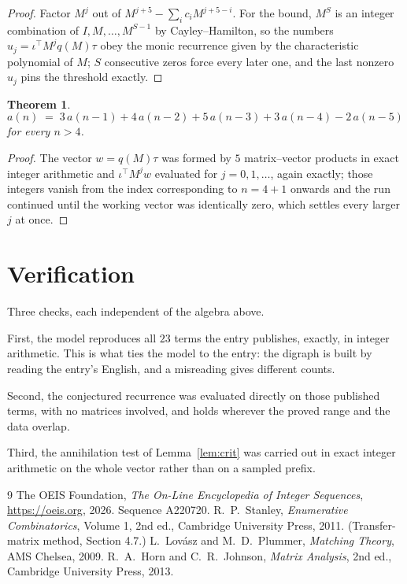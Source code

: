 \documentclass[11pt,a4paper]{article}
\theoremstyle{plain}
\newtheorem{theorem}{Theorem}
\theoremstyle{definition}
\begin{document}
\begin{proof}
Factor $M^{j}$ out of $M^{j+5}-\sum_ic_iM^{j+5-i}$. For the bound, $M^{S}$
is an integer combination of $I,M,\dots,M^{S-1}$ by Cayley--Hamilton, so the numbers
$u_j=\iota^{\!\top}M^{j}q(M)\tau$ obey the monic recurrence given by the characteristic
polynomial of $M$; $S$ consecutive zeros force every later one, and the last nonzero $u_j$
pins the threshold exactly.
\end{proof}

\begin{theorem}
\[
a(n)\;=\;3\,a(n-1) + 4\,a(n-2) + 5\,a(n-3) + 3\,a(n-4) - 2\,a(n-5)
\]
for every $n>4$.
\end{theorem}

\begin{proof}
The vector $w=q(M)\tau$ was formed by $5$ matrix--vector products in exact integer
arithmetic and $\iota^{\!\top}M^{j}w$ evaluated for $j=0,1,\dots$, again exactly; those
integers vanish from the index corresponding to $n=4+1$ onwards and the run continued
until the working vector was identically zero, which settles every larger $j$ at once.
\end{proof}

\section{Verification}

Three checks, each independent of the algebra above.

First, the model reproduces all $23$ terms the entry publishes, exactly, in integer
arithmetic. This is what ties the model to the entry: the digraph is built by reading the
entry's English, and a misreading gives different counts.

Second, the conjectured recurrence was evaluated directly on those published terms, with no
matrices involved, and holds wherever the proved range and the data overlap.

Third, the annihilation test of Lemma~\ref{lem:crit} was carried out in exact integer
arithmetic on the whole vector rather than on a sampled prefix.

\begin{thebibliography}{9}
 The OEIS Foundation, \emph{The On-Line Encyclopedia of Integer
Sequences}, \url{https://oeis.org}, 2026. Sequence A220720.
 R.~P.~Stanley, \emph{Enumerative Combinatorics}, Volume 1, 2nd ed.,
Cambridge University Press, 2011. (Transfer-matrix method, Section 4.7.)
 L.~Lov\'asz and M.~D.~Plummer, \emph{Matching Theory}, AMS Chelsea,
2009.
 R.~A.~Horn and C.~R.~Johnson, \emph{Matrix Analysis}, 2nd ed., Cambridge
University Press, 2013.
\end{thebibliography}
\end{document}
